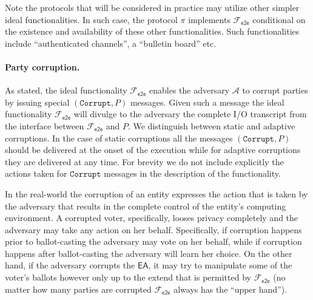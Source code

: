 \documentclass[11pt,letterpaper]{article}
\newcommand{\func}[1][\relax]{\ensuremath{\mathcal{F}_{\mathsf{#1}}}}
\newcommand{\mc}{\mathcal}
\newcommand{\fete}{\func[e2e]}%
\def\EA{\mathsf{EA}}
\def\Corrupt{\mathtt{Corrupt}}
\begin{document}
Note the  protocols that will be  considered in practice may   utilize other simpler ideal
functionalities. In such case, the protocol $\pi$ implements $\fete$ conditional on the
existence and availability of these other functionalities. Such functionalities include
``authenticated channels'', a ``bulletin board'' etc.

\paragraph{Party corruption.} As stated, the ideal functionality $\fete$ enables the 
adversary $\mc{A}$ to corrupt parties by issuing special $(\Corrupt, P)$ messages. 
Given such a message the ideal functionality $\fete$ will divulge to the adversary
the complete I/O transcript from the interface between $\fete$ and $P$. We distinguish
between static and adaptive corruptions. In the case of static corruptions
all the messages $(\Corrupt,P)$ should be  delivered at the onset of the execution
while for adaptive corruptions they are delivered at any time. 
For brevity we do not include explicitly the actions taken for $\Corrupt$
messages in the description of the functionality. 

In the real-world the corruption of an entity expresses the action that is taken by the adversary that
results in the complete control of  the entity's computing environment. A corrupted voter, specifically, looses
privacy completely and the adversary may take any action on her behalf. Specifically, 
if corruption happens prior to ballot-casting the adversary may vote on her behalf,
while if corruption happens after ballot-casting the adversary will learn 
her choice. On the other hand, if the adversary corrupts the $\EA$, it may try to manipulate
some of the voter's ballots however only up to the extend that is permitted by $\fete$
(no matter how many parties are corrupted $\fete$ always has the ``upper hand''). 
\end{document}
